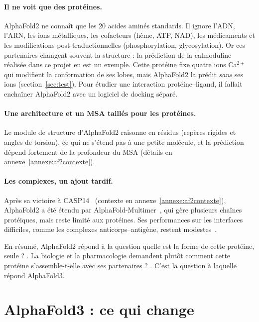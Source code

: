 \paragraph{Il ne voit que des protéines.} AlphaFold2 ne connaît que les 20 acides aminés standards. Il ignore l'ADN, l'ARN, les ions métalliques, les cofacteurs (hème, ATP, NAD), les médicaments et les modifications post-traductionnelles (phosphorylation, glycosylation). Or ces partenaires changent souvent la structure : la prédiction de la calmoduline réalisée dans ce projet en est un exemple. Cette protéine fixe quatre ions Ca$^{2+}$ qui modifient la conformation de ses lobes, mais AlphaFold2 la prédit \emph{sans} ses ions (section~\ref{sec:test}). Pour étudier une interaction protéine--ligand, il fallait enchaîner AlphaFold2 avec un logiciel de docking séparé.

\paragraph{Une architecture et un MSA taillés pour les protéines.} Le module de structure d'AlphaFold2 raisonne en résidus (repères rigides et angles de torsion), ce qui ne s'étend pas à une petite molécule, et la prédiction dépend fortement de la profondeur du MSA (détails en annexe~\ref{annexe:af2contexte}).

\paragraph{Les complexes, un ajout tardif.} Après sa victoire à CASP14~\cite{kryshtafovych2021} (contexte en annexe~\ref{annexe:af2contexte}), AlphaFold2 a été étendu par AlphaFold-Multimer~\cite{evans2021}, qui gère plusieurs chaînes protéiques, mais reste limité aux protéines. Ses performances sur les interfaces difficiles, comme les complexes anticorps--antigène, restent modestes~\cite{abramson2024}.

En résumé, AlphaFold2 répond à la question \og quelle est la forme de cette protéine, seule ? \fg{}. La biologie et la pharmacologie demandent plutôt \og comment cette protéine s'assemble-t-elle avec ses partenaires ? \fg{}. C'est la question à laquelle répond AlphaFold3.

\section{AlphaFold3 : ce qui change}

